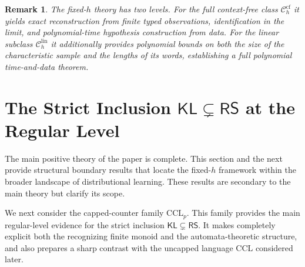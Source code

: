 \documentclass[11pt,a4paper]{article}
\newtheorem{remark}[theorem]{Remark}
\newcommand{\cf}{\mathrm{cf}}
\newcommand{\lin}{\mathrm{lin}}
\newcommand{\Ccf}[1]{\mathcal C_{#1}^{\cf}}
\newcommand{\Clin}[1]{\mathcal C_{#1}^{\lin}}
\begin{document}
\begin{remark}
The fixed-$h$ theory has two levels.
For the full context-free class $\Ccf{h}$ it yields exact reconstruction from finite
typed observations, identification in the limit, and polynomial-time hypothesis
construction from data.
For the linear subclass $\Clin{h}$ it additionally provides polynomial bounds on
both the size of the characteristic sample and the lengths of its words,
establishing a full polynomial time-and-data theorem.
\end{remark}






\section{The Strict Inclusion \texorpdfstring{$\mathsf{KL}\subsetneq\mathsf{RS}$}{KL subsetneq RS} at the Regular Level}
\label{sec:ccl}

The main positive theory of the paper is complete. This section and the next provide structural boundary results that locate the fixed-$h$ framework within the broader landscape of distributional learning. These results are secondary to the main theory but clarify its scope.

We next consider the capped-counter family $\mathrm{CCL}_p$. This family provides the main regular-level evidence for the strict inclusion $\mathsf{KL}\subsetneq\mathsf{RS}$. It makes completely explicit both the recognizing finite monoid and the automata-theoretic structure, and also prepares a sharp contrast with the uncapped language $\mathrm{CCL}$ considered later.
\end{document}
